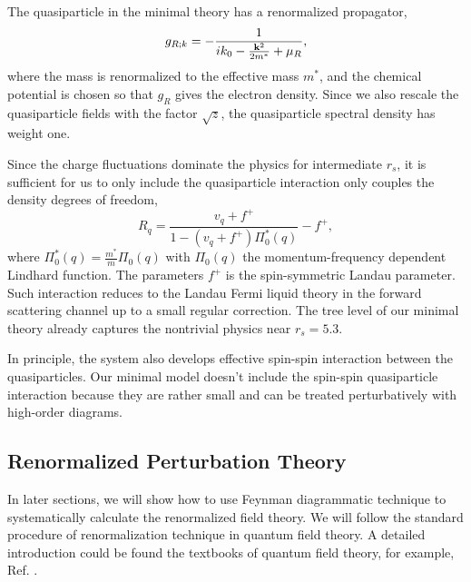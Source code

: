 \documentclass[reprint,amsmath,amssymb,aps,prb]{revtex4-1}
\begin{document}
The quasiparticle in the minimal theory has a renormalized propagator,
\begin{equation}
    \label{eq:gR}
    g_{R;k}=-\frac{1}{ik_0-\frac{\mathbf{k}^2}{2m^*}+\mu_R},
\end{equation}
where the mass is renormalized to the effective mass $m^*$, and the chemical potential is chosen so that $g_R$ gives the electron density. Since we also rescale the quasiparticle fields with the factor $\sqrt{z}$, the quasiparticle spectral density has weight one.

Since the charge fluctuations dominate the physics for intermediate $r_s$, it is sufficient for us to only include the quasiparticle interaction only couples the density degrees of freedom,
\begin{equation}
    \label{eq:R}
    R_q=\frac{v_q+f^+}{1-(v_q+f^+)\Pi^*_0(q)}-f^+,
\end{equation}
where $\Pi_0^*(q)=\frac{m^*}{m}\Pi_0(q)$ with $\Pi_0(q)$ the momentum-frequency dependent Lindhard function. The parameters $f^+$ is the spin-symmetric Landau parameter. Such interaction reduces to the Landau Fermi liquid theory in the forward scattering channel up to a small regular correction. The tree level of our minimal theory already captures the nontrivial physics near $r_s=5.3$.

In principle, the system also develops effective spin-spin interaction between the quasiparticles. Our minimal model doesn't include the spin-spin quasiparticle interaction because they are rather small and can be treated perturbatively with high-order diagrams.


\subsection{Renormalized Perturbation Theory}

In later sections, we will show how to use Feynman diagrammatic technique to systematically calculate the renormalized field theory. We will follow the standard procedure of renormalization technique in quantum field theory. A detailed introduction could be found the textbooks of quantum field theory, for example, Ref. .
\end{document}
